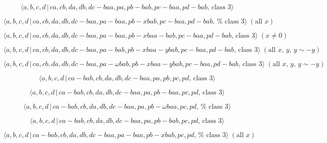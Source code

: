 \documentclass[10pt]{article}
\begin{document}
\begin{equation}
\langle a,b,c,d\,|\,ca,cb,da,db,dc-baa,pa,pb-bab,pc-baa,pd-bab,\,\text{class 
}3\rangle  \tag{7.3493}
\end{equation}

\begin{equation}
\langle a,b,c,d\,|\,ca,cb,da,db,dc-baa,pa-baa,pb-xbab,pc-baa,pd-bab,\,\text{%
class }3\rangle \;(\text{all }x)  \tag{7.3494}
\end{equation}

\begin{equation}
\langle a,b,c,d\,|\,ca,cb,da,db,dc-baa,pa-baa,pb-xbaa-bab,pc-baa,pd-bab,\,%
\text{class }3\rangle \;(x \neq 0)  \tag{7.3495}
\end{equation}

\begin{equation}
\langle a,b,c,d\,|\,ca,cb,da,db,dc-baa,pa-bab,pb-xbaa-ybab,pc-baa,pd-bab,\,%
\text{class }3\rangle \;(\text{all }x,\,y,\,y\sim -y)  \tag{7.3496}
\end{equation}

\begin{equation}
\langle a,b,c,d\,|\,ca,cb,da,db,dc-baa,pa-\omega
bab,pb-xbaa-ybab,pc-baa,pd-bab,\,\text{class }3\rangle \;(\text{all }%
x,\,y,\,y\sim -y)  \tag{7.3497}
\end{equation}

\begin{equation}
\langle a,b,c,d\,|\,ca-bab,cb,da,db,dc-baa,pa,pb,pc,pd,\,\text{class }%
3\rangle  \tag{7.3498}
\end{equation}

\begin{equation}
\langle a,b,c,d\,|\,ca-bab,cb,da,db,dc-baa,pa,pb-baa,pc,pd,\,\text{class }%
3\rangle  \tag{7.3499}
\end{equation}

\begin{equation}
\langle a,b,c,d\,|\,ca-bab,cb,da,db,dc-baa,pa,pb-\omega baa,pc,pd,\,\text{%
class }3\rangle  \tag{7.3500}
\end{equation}

\begin{equation}
\langle a,b,c,d\,|\,ca-bab,cb,da,db,dc-baa,pa,pb-bab,pc,pd,\,\text{class }%
3\rangle  \tag{7.3501}
\end{equation}

\begin{equation}
\langle a,b,c,d\,|\,ca-bab,cb,da,db,dc-baa,pa-baa,pb-xbab,pc,pd,\,\text{%
class }3\rangle \;(\text{all }x)  \tag{7.3502}
\end{equation}
\end{document}
